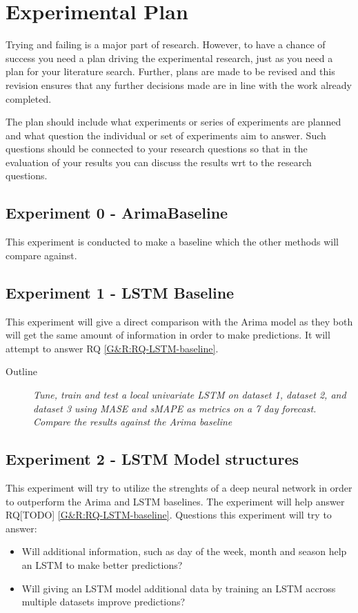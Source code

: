 
\section{Experimental Plan}
\label{sec:experimentalPlan}

Trying and failing is a major part of research. However, to have a chance of success you need a plan driving the experimental research, just as you need a plan for your literature search. Further, plans are made to be revised and this revision ensures that any further decisions made are in line with the work already completed.

The plan should include what experiments or series of experiments are planned and what question the individual or set of experiments aim to answer. Such questions should be connected to your research questions so that in the evaluation of your results you can discuss the results wrt to the research questions.



\subsection{Experiment 0 - ArimaBaseline}
This experiment is conducted to make a baseline which the other methods
will compare against.

\subsection{Experiment 1 - LSTM Baseline}
This experiment will give a direct comparison with the Arima model as they both will
get the same amount of information in order to make predictions.
It will attempt to answer RQ \cref{G&R:RQ-LSTM-baseline}.

\begin{description}
  \item[Outline]{\it Tune, train and test a local univariate LSTM on dataset 1,
              dataset 2, and dataset 3 using MASE and sMAPE as metrics on a 7 day forecast. Compare the results against the Arima baseline}
\end{description}

\subsection{Experiment 2 - LSTM Model structures}
This experiment will try to utilize the strenghts of a deep neural network
in order to outperform the Arima and LSTM baselines. The experiment will
help answer RQ[TODO] \cref{G&R:RQ-LSTM-baseline}.
Questions this experiment will try to answer:
\begin{itemize}
  \item Will additional information, such as day of the week, month and season help an LSTM to make better predictions?
  \item {Will giving an LSTM model additional data by training an LSTM accross multiple datasets improve predictions?}
\end{itemize}

